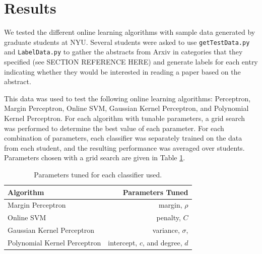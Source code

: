 \documentclass[12pt]{article}
\begin{document}
\section{Results}
\label{sec:results}

We tested the different online learning algorithms with sample data generated by graduate students at NYU.  Several students were asked to use {\tt getTestData.py} and {\tt LabelData.py} to gather the abstracts from Arxiv in categories that they specified (see SECTION REFERENCE HERE) and generate labels for each entry indicating whether they would be interested in reading a paper based on the abstract.

This data was used to test the following online learning algorithms: Perceptron, Margin Perceptron, Online SVM, Gaussian Kernel Perceptron, and Polynomial Kernel Perceptron.  For each algorithm with tunable parameters, a grid search was performed to determine the best value of each parameter. For each combination of parameters, each classifier was separately trained on the data from each student, and the resulting performance was averaged over students.  Parameters chosen with a grid search are given in Table \ref{table:Parametertable}.  \\
\begin{table}[h]
\centering
\begin{tabular}{l | r}
Algorithm & Parameters Tuned \\
\hline
Margin Perceptron &  margin, $\rho$  \\
Online SVM & penalty, $C$ \\
Gaussian Kernel Perceptron &  variance, $\sigma$, \\
Polynomial Kernel Perceptron &  intercept, $c$, and degree, $d$ \\
\hline
\end{tabular} 
\label{table:Parametertable}
\caption{Parameters tuned for each classifier used.}
\end{table}
\end{document}
